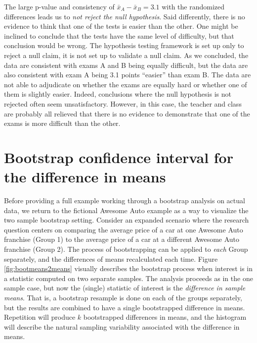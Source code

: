 \documentclass[
  10pt,
  openany]{book}
\begin{document}
The large p-value and consistency of \(\bar{x}_A - \bar{x}_B=3.1\) with the randomized differences leads us to \emph{not reject the null hypothesis}.
Said differently, there is no evidence to think that one of the tests is easier than the other.
One might be inclined to conclude that the tests have the same level of difficulty, but that conclusion would be wrong.
The hypothesis testing framework is set up only to reject a null claim, it is not set up to validate a null claim.
As we concluded, the data are consistent with exams A and B being equally difficult, but the data are also consistent with exam A being 3.1 points ``easier'' than exam B.
The data are not able to adjudicate on whether the exams are equally hard or whether one of them is slightly easier.
Indeed, conclusions where the null hypothesis is not rejected often seem unsatisfactory.
However, in this case, the teacher and class are probably all relieved that there is no evidence to demonstrate that one of the exams is more difficult than the other.

\hypertarget{bootstrap-confidence-interval-for-the-difference-in-means}{%
\section{Bootstrap confidence interval for the difference in means}\label{bootstrap-confidence-interval-for-the-difference-in-means}}

Before providing a full example working through a bootstrap analysis on actual data, we return to the fictional Awesome Auto example as a way to visualize the two sample bootstrap setting.
Consider an expanded scenario where the research question centers on comparing the average price of a car at one Awesome Auto franchise (Group 1) to the average price of a car at a different Awesome Auto franchise (Group 2).
The process of bootstrapping can be applied to \emph{each} Group separately, and the differences of means recalculated each time.
Figure \ref{fig:bootmeans2means} visually describes the bootstrap process when interest is in a statistic computed on two separate samples.
The analysis proceeds as in the one sample case, but now the (single) statistic of interest is the \emph{difference in sample means}.
That is, a bootstrap resample is done on each of the groups separately, but the results are combined to have a single bootstrapped difference in means.
Repetition will produce \(k\) bootstrapped differences in means, and the histogram will describe the natural sampling variability associated with the difference in means.
\end{document}

